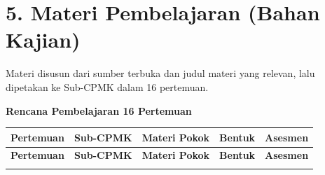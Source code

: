 \documentclass[12pt,a4paper]{article}
\begin{document}
\vspace{0.5cm}

\section*{5. Materi Pembelajaran (Bahan Kajian)}

Materi disusun dari sumber terbuka dan judul materi yang relevan, lalu dipetakan ke Sub-CPMK dalam 16 pertemuan.

\textbf{Rencana Pembelajaran 16 Pertemuan}

\begin{longtable}{|c|>{\raggedright\arraybackslash}p{3cm}|>{\raggedright\arraybackslash}p{6.2cm}|>{\raggedright\arraybackslash}p{2.2cm}|>{\raggedright\arraybackslash}p{2.2cm}|}
\hline
\textbf{Pertemuan} & \textbf{Sub-CPMK} & \textbf{Materi Pokok} & \textbf{Bentuk} & \textbf{Asesmen} \\
\hline
\endfirsthead
\hline
\textbf{Pertemuan} & \textbf{Sub-CPMK} & \textbf{Materi Pokok} & \textbf{Bentuk} & \textbf{Asesmen} \\
\hline
\endhead
\hline
\endfoot


\end{longtable}
\end{document}
